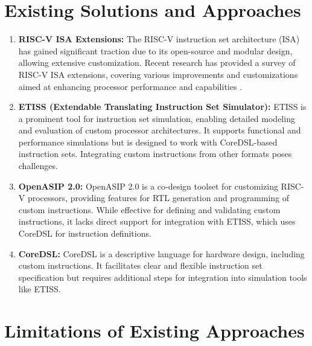 \section{Existing Solutions and Approaches}

\begin{enumerate}

    \item \textbf{RISC-V ISA Extensions:}
    The RISC-V instruction set architecture (ISA) has gained significant traction due to its open-source and modular design, allowing extensive customization.
    Recent research has provided a survey of RISC-V ISA extensions, covering various improvements and customizations aimed at enhancing processor performance and capabilities \cite{Risc-v}.

    \item \textbf{ETISS (Extendable Translating Instruction Set Simulator):}
    ETISS \cite{ETISS} is a prominent tool for instruction set simulation, enabling detailed modeling and evaluation of custom processor architectures.
    It supports functional and performance simulations but is designed to work with CoreDSL-based instruction sets. Integrating custom instructions from other formats poses challenges.

    \item \textbf{OpenASIP 2.0:}
    OpenASIP 2.0 \cite{OpenASIP} is a co-design toolset for customizing RISC-V processors, providing features for RTL generation and programming of custom instructions.
    While effective for defining and validating custom instructions, it lacks direct support for integration with ETISS, which uses CoreDSL for instruction definitions.

    \item \textbf{CoreDSL:}
    CoreDSL \cite{CoreDSL} is a descriptive language for hardware design, including custom instructions.
    It facilitates clear and flexible instruction set specification but requires additional steps for integration into simulation tools like ETISS.

\end{enumerate}

\section{Limitations of Existing Approaches}

